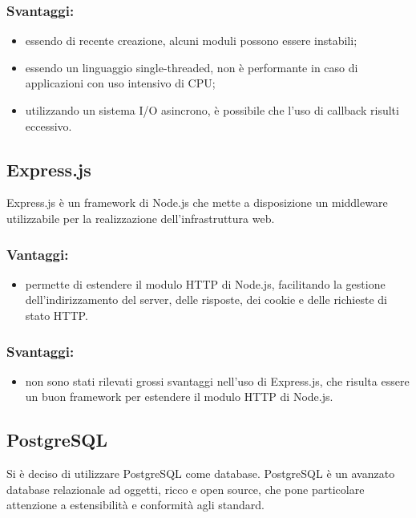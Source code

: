 \documentclass[a4paper, titlepage]{article}
\begin{document}
\subsubsection{Svantaggi:}

\begin{itemize}
	\item essendo di recente creazione, alcuni moduli possono essere instabili;
	\item essendo un linguaggio single-threaded, non è performante in caso di applicazioni con uso
	intensivo di CPU;
	\item utilizzando un sistema I/O asincrono, è possibile che l’uso di callback risulti eccessivo.
\end{itemize}

\subsection{Express.js}
Express.js è un framework di Node.js che mette a disposizione un middleware utilizzabile per la realizzazione dell’infrastruttura web.

\subsubsection{Vantaggi:}

\begin{itemize}
	\item permette di estendere il modulo HTTP di Node.js, facilitando la gestione dell’indirizzamento del server, delle risposte, dei cookie e delle richieste di stato HTTP.
\end{itemize}

\subsubsection{Svantaggi:}

\begin{itemize}
	\item non sono stati rilevati grossi svantaggi nell'uso di Express.js, che risulta essere un buon framework per estendere il modulo HTTP di Node.js.
\end{itemize}

\subsection{PostgreSQL}
Si è deciso di utilizzare PostgreSQL come database. PostgreSQL è un avanzato database relazionale ad oggetti, ricco e open source, che pone particolare attenzione a estensibilità e conformità agli standard.
\end{document}
